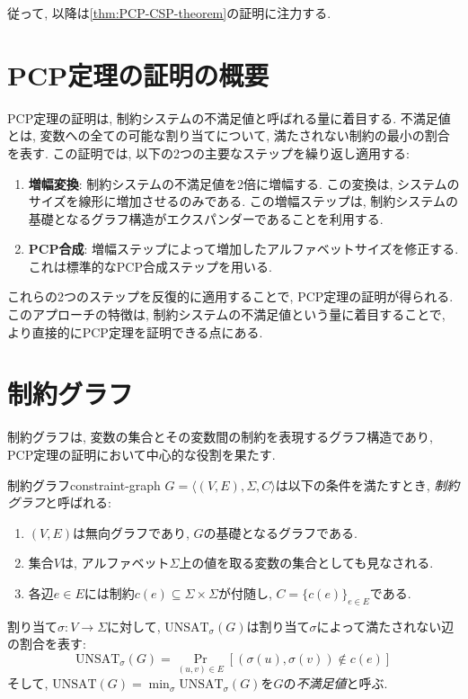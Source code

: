 従って, 以降は\cref{thm:PCP-CSP-theorem}の証明に注力する.

\section{PCP定理の証明の概要}

PCP定理の証明は, 制約システムの不満足値と呼ばれる量に着目する. 不満足値とは, 変数への全ての可能な割り当てについて, 満たされない制約の最小の割合を表す. この証明では, 以下の2つの主要なステップを繰り返し適用する:

\begin{enumerate}
\item \textbf{増幅変換}: 制約システムの不満足値を2倍に増幅する. この変換は, システムのサイズを線形に増加させるのみである. この増幅ステップは, 制約システムの基礎となるグラフ構造がエクスパンダーであることを利用する.

\item \textbf{PCP合成}: 増幅ステップによって増加したアルファベットサイズを修正する. これは標準的なPCP合成ステップを用いる.
\end{enumerate}

これらの2つのステップを反復的に適用することで, PCP定理の証明が得られる. このアプローチの特徴は, 制約システムの不満足値という量に着目することで, より直接的にPCP定理を証明できる点にある.

\section{制約グラフ}

制約グラフは, 変数の集合とその変数間の制約を表現するグラフ構造であり,
PCP定理の証明において中心的な役割を果たす.

\begin{definition}{制約グラフ}{constraint-graph}
  $G = \langle(V, E), \Sigma, C\rangle$は以下の条件を満たすとき, \emph{制約グラフ}と呼ばれる:
  \begin{enumerate}
  \item $(V, E)$は無向グラフであり, $G$の基礎となるグラフである.
  \item 集合$V$は, アルファベット$\Sigma$上の値を取る変数の集合としても見なされる.
  \item 各辺$e \in E$には制約$c(e) \subseteq \Sigma \times \Sigma$が付随し, $C = \{c(e)\}_{e\in E}$である.
  \end{enumerate}

  割り当て$\sigma: V \rightarrow \Sigma$に対して, $\mathrm{UNSAT}_{\sigma}(G)$は割り当て$\sigma$によって満たされない辺の割合を表す:
  \[\mathrm{UNSAT}_{\sigma}(G) = \Pr_{(u,v)\in E}[(\sigma(u), \sigma(v)) \not\in c(e)]\]
  そして, $\mathrm{UNSAT}(G) = \min_{\sigma} \mathrm{UNSAT}_{\sigma}(G)$を$G$の\emph{不満足値}と呼ぶ.
\end{definition}



